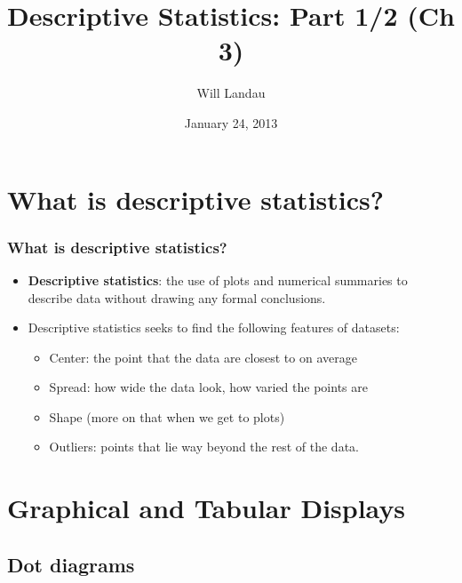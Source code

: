 \documentclass[handout]{beamer}\usepackage{graphicx, color}
\title{Descriptive Statistics: Part 1/2 (Ch 3)}
\author{Will Landau}
\date{January 24, 2013}
\institute{Iowa State University}
\numberwithin{equation}{section}
\begin{document}
\begin{frame}
\titlepage
 \end{frame}
 

\section{What is descriptive statistics?}

\begin{frame}
\frametitle{What is descriptive statistics?}

\begin{itemize}
\pause \item {\bf Descriptive statistics}: the use of plots and numerical summaries to describe data without drawing any formal conclusions.
\pause \item Descriptive statistics seeks to find the following features of datasets:
\begin{itemize}
\pause \item Center: the point that the data are closest to on average
\pause \item Spread: how wide the data look, how varied the points are
\pause \item Shape (more on that when we get to plots)
\pause \item Outliers: points that lie way beyond the rest of the data.
\end{itemize}
\end{itemize}

\end{frame}


\section{Graphical and Tabular Displays}

\subsection{Dot diagrams}
\end{document}
